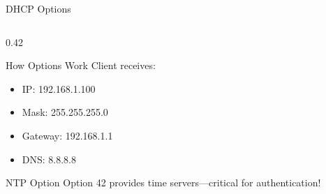 \documentclass[aspectratio=169]{beamer}  %
\begin{document}
\begin{frame}{DHCP Options}
\begin{columns}[T]
\begin{column}{0.42\textwidth}
\begin{block}{How Options Work}
                \vspace{0.2em}
                Client receives:
                \begin{itemize}\setlength{\itemsep}{1pt}
                    \item IP: 192.168.1.100
                    \item Mask: 255.255.255.0
                    \item Gateway: 192.168.1.1
                    \item DNS: 8.8.8.8
                \end{itemize}
            \end{block}
            
            \vspace{0.2em}
            \begin{alertblock}{NTP Option}
                \small
                Option 42 provides time servers---critical for authentication!
            \end{alertblock}
        \end{column}
    \end{columns}
\end{frame}
\end{document}
